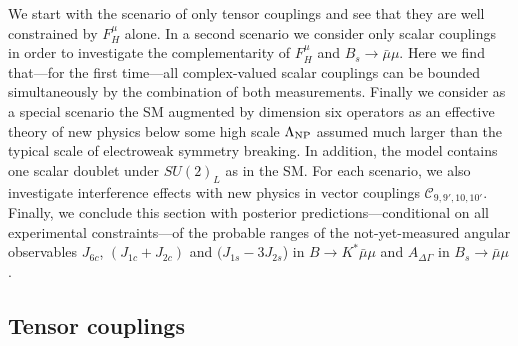 \documentclass[twocolumn,epjc3]{svjour3}
\numberwithin{equation}{section}
\newcommand{\wilson}[2][{}]{\mathcal{C}_{#2}^{\mathrm{#1}}}
\renewcommand{\[}{\big[}
\renewcommand{\]}{\big]}
\renewcommand{\(}{\big(}
\renewcommand{\)}{\big)}
\begin{document}
We start with the scenario of only tensor couplings and see that they are well
constrained by $F_H^\mu$ alone. In a second scenario we consider only scalar
couplings in order to investigate the complementarity of $F_H^\mu$ and $B_s \to
\bar\mu\mu$. Here we find that---for the first time---all complex-valued scalar
couplings can be bounded simultaneously by the combination of both
measurements. Finally we consider as a special scenario the SM augmented by
dimension six operators as an effective theory of new physics below some high
scale $\Lambda_{\rm NP}$ assumed much larger than the typical scale of
electroweak symmetry breaking. In addition, the model contains one scalar
doublet under $SU(2)_L$ as in the SM. For each scenario, we also investigate
interference effects with new physics in vector couplings {$\wilson{9,9',10,10'}$}. Finally, we conclude
this section with posterior predictions---conditional on all experimental
constraints---of the probable ranges of the not-yet-measured angular observables
{$J_{6c}$, $(J_{1c}+J_{2c})$ and $(J_{1s} - 3J_{2s}$)}
in $B\to K^*\bar\mu\mu$ and $A_{\Delta\Gamma}$ in $B_s\to\bar\mu\mu$.

%
%
\subsection{Tensor couplings \label{sec:tensor}}
\end{document}
